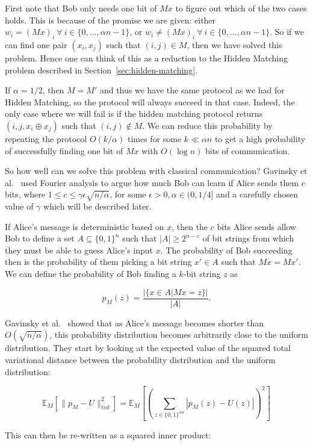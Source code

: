 \documentclass[a4paper]{article}
\begin{document}
        First note that Bob only needs one bit of $Mx$ to figure out which of the two cases holds. This is because of the promise we are given: either $w_i = (Mx)_i~\forall~i\in\{0,...,\alpha n - 1\}$, or $w_i \neq (Mx)_i~\forall~i\in\{0,...,\alpha n - 1\}$. So if we can find one pair $(x_i, x_j)$ such that $(i, j) \in M$, then we have solved this problem. Hence one can think of this as a reduction to the Hidden Matching problem described in Section~\ref{sec:hidden-matching}.

        If $\alpha = 1/2$, then $M = M'$ and thus we have the same protocol as we had for Hidden Matching, so the protocol will always succeed in that case. Indeed, the only case where we will fail is if the hidden matching protocol returns $(i, j, x_i \oplus x_j)$ such that $(i, j) \notin M$. We can reduce this probability by repeating the protocol $O(k/\alpha)$ times for some $k \ll \alpha n$ to get a high probability of successfully finding one bit of $Mx$ with $O(\log n)$ bits of communication.

        So how well can we solve this problem with classical communication? Gavinsky et al.~\cite{Gavinsky:2007:ESO:1250790.1250866} used Fourier analysis to argue how much Bob can learn if Alice sends them $c$ bits, where $1 \leq c \leq \gamma \epsilon\sqrt{n/\alpha}$, for some $\epsilon > 0, \alpha \in (0,1/4]$ and a carefully chosen value of $\gamma$ which will be described later.

        If Alice's message is deterministic based on $x$, then the $c$ bits Alice sends allow Bob to define a set $A \subseteq \{0, 1\}^n$ such that $|A| \geq 2^{n-c}$ of bit strings from which they must be able to guess Alice's input $x$. The probability of Bob succeeding then is the probability of them picking a bit string $x' \in A$ such that $Mx = Mx'$. We can define the probability of Bob finding a $k$-bit string $z$ as

        $$p_M(z) = \frac{|\{x \in A|Mx = z\}|}{|A|}.$$

        Gavinsky et al.~ showed that as Alice's message becomes shorter than $O(\sqrt{n/\alpha})$, this probability distribution becomes arbitrarily close to the uniform distribution. They start by looking at the expected value of the squared total variational distance between the probability distribution and the uniform distribution:

        $$\mathbb{E}_M[\|p_M - U\|_{tvd}^2] = \mathbb{E}_M[(\sum_{z \in \{0, 1\}^{\alpha n}}|p_M(z) - U(z)|)^2]$$

        This can then be re-written as a squared inner product:
\end{document}
